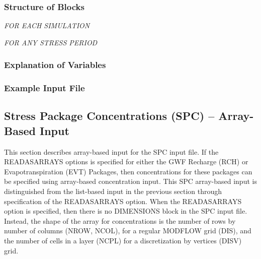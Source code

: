 \vspace{5mm}
\subsubsection{Structure of Blocks}
\vspace{5mm}

\noindent \textit{FOR EACH SIMULATION}


\vspace{5mm}
\noindent \textit{FOR ANY STRESS PERIOD}


\vspace{5mm}
\subsubsection{Explanation of Variables}
\begin{description}

\end{description}

\subsubsection{Example Input File}


\newpage
\subsection{Stress Package Concentrations (SPC) -- Array-Based Input}

This section describes array-based input for the SPC input file.  If the READASARRAYS options is specified for either the GWF Recharge (RCH) or Evapotranspiration (EVT) Packages, then concentrations for these packages can be specified using array-based concentration input.  This SPC array-based input is distinguished from the list-based input in the previous section through specification of the READASARRAYS option.  When the READASARRAYS option is specified, then there is no DIMENSIONS block in the SPC input file.  Instead, the shape of the array for concentrations is the number of rows by number of columns (NROW, NCOL), for a regular MODFLOW grid (DIS), and the number of cells in a layer (NCPL) for a discretization by vertices (DISV) grid.

\vspace{5mm}
